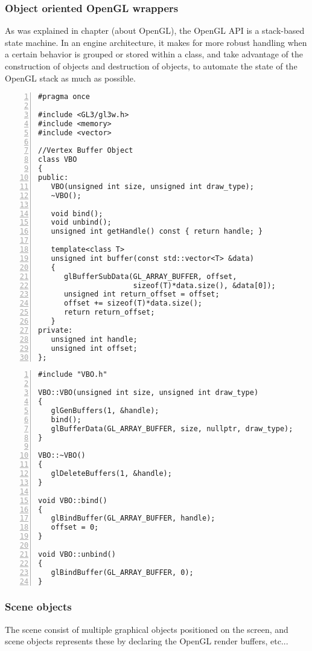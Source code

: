 \subsubsection{Object oriented OpenGL wrappers}
As was explained in chapter (about OpenGL), the OpenGL API is a stack-based state machine. In an engine architecture, it makes for more robust handling when a certain behavior is grouped or stored within a class, and take advantage of the construction of objects and destruction of objects, to automate the state of the OpenGL stack as much as possible.

\begin{Verbatim}[frame=single, numbers=left, label=VBO header]
#pragma once

#include <GL3/gl3w.h>
#include <memory>
#include <vector>

//Vertex Buffer Object
class VBO
{
public:
   VBO(unsigned int size, unsigned int draw_type);
   ~VBO();

   void bind();
   void unbind();
   unsigned int getHandle() const { return handle; }

   template<class T>
   unsigned int buffer(const std::vector<T> &data)
   {
      glBufferSubData(GL_ARRAY_BUFFER, offset, 
                      sizeof(T)*data.size(), &data[0]);
      unsigned int return_offset = offset;
      offset += sizeof(T)*data.size();
      return return_offset;
   }
private:
   unsigned int handle;
   unsigned int offset;
};
\end{Verbatim}

\begin{Verbatim}[frame=single, numbers=left, label=VBO implementation]
#include "VBO.h"

VBO::VBO(unsigned int size, unsigned int draw_type)
{
   glGenBuffers(1, &handle);
   bind();
   glBufferData(GL_ARRAY_BUFFER, size, nullptr, draw_type);
}

VBO::~VBO()
{
   glDeleteBuffers(1, &handle);
}

void VBO::bind()
{
   glBindBuffer(GL_ARRAY_BUFFER, handle);
   offset = 0;
}

void VBO::unbind()
{
   glBindBuffer(GL_ARRAY_BUFFER, 0);
}
\end{Verbatim}

\subsubsection{Scene objects}
The scene consist of multiple graphical objects positioned on the screen, and scene objects represents these by declaring the OpenGL render buffers, etc...

